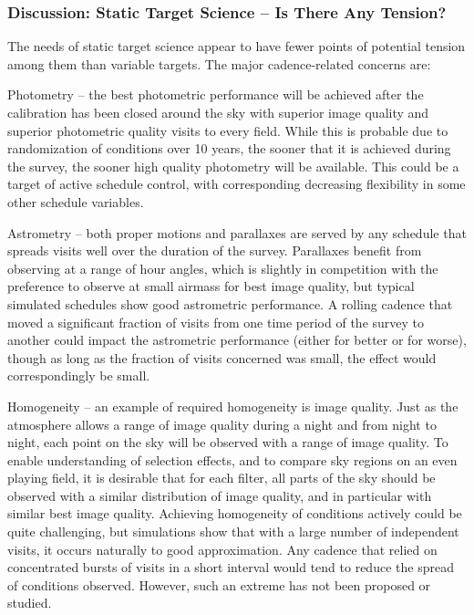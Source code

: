 
\subsubsection{Discussion: Static Target Science -- Is There Any Tension?}

The needs of static target science appear to have fewer points of
potential tension among them than variable targets.  The major
cadence-related concerns are:

\begin{description}

\item{Photometry} -- the best photometric performance will be achieved
after the calibration has been closed around the sky with superior image
quality and superior photometric quality visits to every field.  While
this is probable due to randomization of conditions over 10 years, the
sooner that it is achieved during the survey, the sooner high quality
photometry will be available.  This could be a target of active schedule
control, with corresponding decreasing flexibility in some other
schedule variables.

\item{Astrometry} -- both proper motions and parallaxes are served by
any schedule that spreads visits well over the duration of the survey.
Parallaxes benefit from observing at a range of hour angles, which is
slightly in competition with the preference to observe at small airmass
for best image quality, but typical simulated schedules show good
astrometric performance. A rolling cadence that moved a significant
fraction of visits from one time period of the survey to another could
impact the astrometric performance (either for better or for worse),
though as long as the fraction of visits concerned was small, the effect
would correspondingly be small.

\item{Homogeneity} -- an  example of required homogeneity is image
quality. Just as the atmosphere allows a range of image quality during a
night and from night to night, each point on the sky will be observed
with a range of image quality.  To enable understanding of selection
effects, and to compare sky regions on an even playing field, it is
desirable that for each filter, all parts of the sky should be observed
with a similar distribution of image quality, and in particular with
similar best image quality. Achieving homogeneity of conditions actively
could be quite challenging, but simulations show that with a large
number of independent visits, it occurs naturally to good approximation.
Any cadence that relied on concentrated bursts of visits in a short
interval would tend to reduce the spread of conditions observed.
However, such an extreme has not been proposed or studied.


\end{description}
